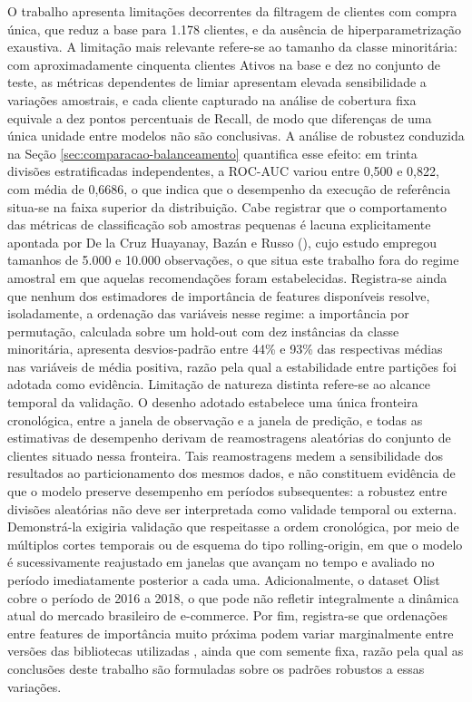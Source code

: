 O trabalho apresenta limitações decorrentes da filtragem de clientes com compra única, que reduz a base para 1.178 clientes, e da ausência de hiperparametrização exaustiva. A limitação mais relevante refere-se ao tamanho da classe minoritária: com aproximadamente cinquenta clientes Ativos na base e dez no conjunto de teste, as métricas dependentes de limiar apresentam elevada sensibilidade a variações amostrais, e cada cliente capturado na análise de cobertura fixa equivale a dez pontos percentuais de Recall, de modo que diferenças de uma única unidade entre modelos não são conclusivas. A análise de robustez conduzida na Seção \ref{sec:comparacao-balanceamento} quantifica esse efeito: em trinta divisões estratificadas independentes, a ROC-AUC variou entre 0,500 e 0,822, com média de 0,6686, o que indica que o desempenho da execução de referência situa-se na faixa superior da distribuição. Cabe registrar que o comportamento das métricas de classificação sob amostras pequenas é lacuna explicitamente apontada por De la Cruz Huayanay, Bazán e Russo (\citeyear{delacruz2025}), cujo estudo empregou tamanhos de 5.000 e 10.000 observações, o que situa este trabalho fora do regime amostral em que aquelas recomendações foram estabelecidas. Registra-se ainda que nenhum dos estimadores de importância de features disponíveis resolve, isoladamente, a ordenação das variáveis nesse regime: a importância por permutação, calculada sobre um hold-out com dez instâncias da classe minoritária, apresenta desvios-padrão entre 44\% e 93\% das respectivas médias nas variáveis de média positiva, razão pela qual a estabilidade entre partições foi adotada como evidência. Limitação de natureza distinta refere-se ao alcance temporal da validação. O desenho adotado estabelece uma única fronteira cronológica, entre a janela de observação e a janela de predição, e todas as estimativas de desempenho derivam de reamostragens aleatórias do conjunto de clientes situado nessa fronteira. Tais reamostragens medem a sensibilidade dos resultados ao particionamento dos mesmos dados, e não constituem evidência de que o modelo preserve desempenho em períodos subsequentes: a robustez entre divisões aleatórias não deve ser interpretada como validade temporal ou externa. Demonstrá-la exigiria validação que respeitasse a ordem cronológica, por meio de múltiplos cortes temporais ou de esquema do tipo rolling-origin, em que o modelo é sucessivamente reajustado em janelas que avançam no tempo e avaliado no período imediatamente posterior a cada uma. Adicionalmente, o dataset Olist cobre o período de 2016 a 2018, o que pode não refletir integralmente a dinâmica atual do mercado brasileiro de e-commerce. Por fim, registra-se que ordenações entre features de importância muito próxima podem variar marginalmente entre versões das bibliotecas utilizadas \cite{pedregosa2011}, ainda que com semente fixa, razão pela qual as conclusões deste trabalho são formuladas sobre os padrões robustos a essas variações.

